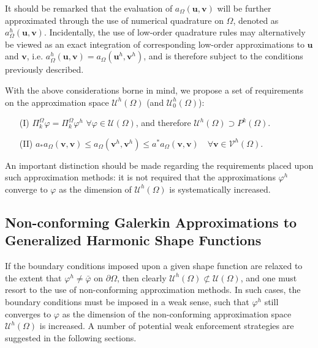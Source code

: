 	It should be remarked that the evaluation of $a_{\Omega}(\mathbf{u},\mathbf{v})$ will be further approximated through the use of numerical quadrature on $\Omega$, denoted as $a^h_{\Omega}(\mathbf{u},\mathbf{v})$. Incidentally, the use of low-order quadrature rules may alternatively be viewed as an exact integration of corresponding low-order approximations to $\mathbf{u}$ and $\mathbf{v}$, i.e. $a^h_{\Omega}(\mathbf{u},\mathbf{v}) = a_{\Omega}(\mathbf{u}^h,\mathbf{v}^h)$, and is therefore subject to the conditions previously described.
	
	With the above considerations borne in mind, we propose a set of requirements on the approximation space $\mathcal{U}^h (\Omega)$ (and $\mathcal{U}^h_0 (\Omega)$):
	\begin{itemize}
		\item[(I)] $\Pi^{\Omega}_k \varphi = \Pi^{\Omega}_k \varphi^h \, \, \forall \varphi \in \mathcal{U}(\Omega)$, and therefore $\mathcal{U}^h (\Omega) \supset P^k (\Omega)$.
		\item[(II)] $a_* a_{\Omega} (\mathbf{v},\mathbf{v}) \leq a_{\Omega} (\mathbf{v}^h,\mathbf{v}^h) \leq a^* a_{\Omega} (\mathbf{v},\mathbf{v}) \quad \forall \mathbf{v} \in \mathcal{V}^h (\Omega).$
	\end{itemize}
	
	An important distinction should be made regarding the requirements placed upon such approximation methods: it is not required that the approximations $\varphi^h$ converge to $\varphi$ as the dimension of $\mathcal{U}^h (\Omega)$ is systematically increased.
	
\subsection*{Non-conforming Galerkin Approximations to \\ Generalized Harmonic Shape Functions}

	If the boundary conditions imposed upon a given shape function are relaxed to the extent that $\varphi^h \neq \bar{\varphi}$ on $\partial \Omega$, then clearly $\mathcal{U}^h (\Omega) \not\subset \mathcal{U} (\Omega)$, and one must resort to the use of non-conforming approximation methods. In such cases, the boundary conditions must be imposed in a weak sense, such that $\varphi^h$ still converges to $\varphi$ as the dimension of the non-conforming approximation space $\mathcal{U}^h (\Omega)$ is increased. A number of potential weak enforcement strategies are suggested in the following sections.
	
